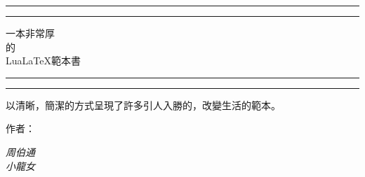 \begin{titlepage} %

  \centering %

  \itshape %

  \vspace*{\baselineskip} %


  \rule{\textwidth}{1.6pt}\vspace*{-\baselineskip}\vspace*{2pt} %
  \rule{\textwidth}{0.4pt} %

  \vspace{0.75\baselineskip} %

  {\LARGE\iyan 一本非常厚\\ 的\\ Lua\LaTeX 範本書\\} %

  \vspace{0.75\baselineskip} %

  \rule{\textwidth}{0.4pt}\vspace*{-\baselineskip}\vspace{3.2pt} %
  \rule{\textwidth}{1.6pt} %

  \vspace{2\baselineskip} %


  {\sf 以清晰，簡潔的方式呈現了許多引人入勝的，改變生活的範本。}

  \vspace*{3\baselineskip} %


  作者：

  \vspace{0.5\baselineskip} %

  {\itshape\Large 周伯通\\ 小龍女\\} %


\end{titlepage}
